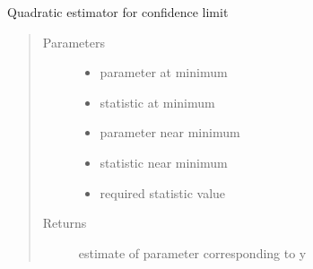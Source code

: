 \documentclass[letterpaper,10pt,english]{sphinxmanual}
\begin{document}
\begin{fulllineitems}
\label{\detokenize{images_functions:images.quaderr}}
Quadratic estimator for confidence limit
\begin{quote}\begin{description}
\item[{Parameters}] \leavevmode\begin{itemize}
\item {} 
 \textendash{} parameter at minimum

\item {} 
 \textendash{} statistic at minimum

\item {} 
 \textendash{} parameter near minimum

\item {} 
 \textendash{} statistic near minimum

\item {} 
 \textendash{} required statistic value

\end{itemize}

\item[{Returns}] \leavevmode
estimate of parameter corresponding to y

\end{description}\end{quote}

\end{fulllineitems}

\end{document}
